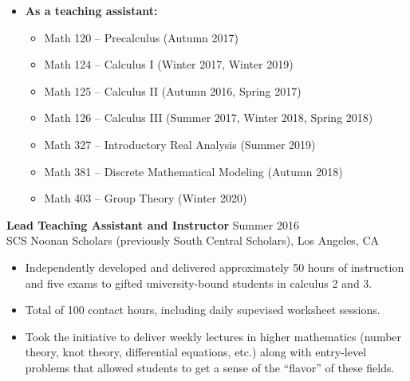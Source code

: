 \documentclass[margin]{res} %
\begin{document}
\begin{resume}
\begin{itemize}
\begin{itemize}
	My focus during this quarter was on developing the students' ability to solve problems they hadn't seen before. In service of this, we dedicated a third of our contact time to solving problems in small groups with my oversight.
	My initial course structure wasn't adequately meeting the needs of the class (which I determined from soliciting feedback), so after the first midterm we pivoted to having more worked-out examples in class, for which the students were thankful.
	In order to encourage students to investigate how linear algebra was used in the real world, the students were assigned a poster project. Topics included applications of linear algebra in medical imaging, computer graphics, and in the social sciences. 
\end{itemize}
\item \textbf{As a teaching assistant:} 
\begin{itemize}
	\item Math 120 -- Precalculus (Autumn 2017)
	\item Math 124 -- Calculus I (Winter 2017, Winter 2019)
	\item Math 125 -- Calculus II (Autumn 2016, Spring 2017)
	\item Math 126 -- Calculus III (Summer 2017, Winter 2018, Spring 2018)
	\item Math 327 -- Introductory Real Analysis (Summer 2019)
	\item Math 381 -- Discrete Mathematical Modeling (Autumn 2018)
	\item Math 403 -- Group Theory (Winter 2020)
\end{itemize}
\end{itemize}
 
{\bf Lead Teaching Assistant and Instructor} \hfill Summer 2016 \\
SCS Noonan Scholars (previously South Central Scholars), Los Angeles, CA
\begin{itemize} \itemsep -1pt
\item Independently developed and delivered  approximately 50 hours of instruction and five exams to gifted university-bound students in calculus 2 and 3.
\item Total of 100 contact hours, including daily supevised worksheet sessions.
\item Took the initiative to deliver weekly lectures in higher mathematics (number theory, knot theory, differential equations, etc.) along with entry-level problems that allowed students to get a sense of the “flavor” of these fields.
\end{itemize} 


\end{resume}
\end{document}
